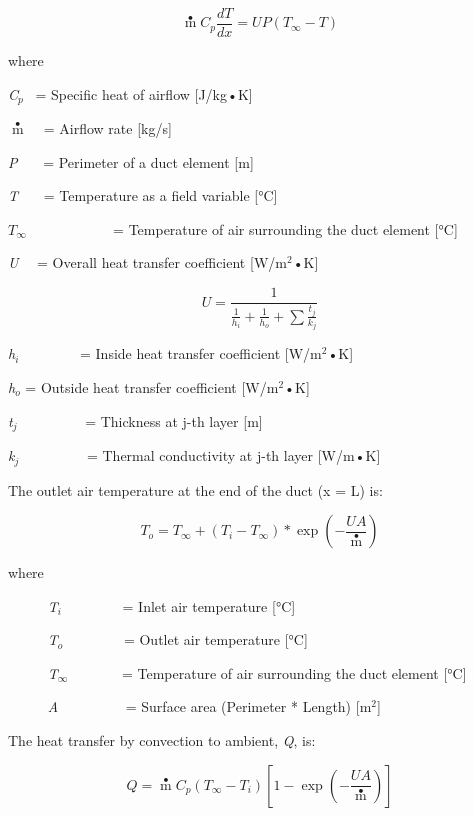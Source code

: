 \begin{equation}
\mathop m\limits^ \bullet  {C_p}\frac{{dT}}{{dx}} = UP(T{}_\infty  - T)
\end{equation}

where

\emph{C\(_{p}\)}~ = Specific heat of airflow {[}J/kg•K{]}

\(\mathop m\limits^ \bullet\) ~ = Airflow rate {[}kg/s{]}

\emph{P}~~~ = Perimeter of a duct element {[}m{]}

\emph{T}~~~ = Temperature as a field variable {[}°C{]}

\(T{}_\infty\) ~~~~~~~~~~~ = Temperature of air surrounding the duct element {[}°C{]}

\emph{U}~~ = Overall heat transfer coefficient {[}W/m\(^{2}\)•K{]}

\begin{equation}
U = \frac{1}{{\frac{1}{{{h_i}}} + \frac{1}{{{h_o}}} + \sum {\frac{{{t_j}}}{{{k_j}}}} }}
\end{equation}

\emph{h\(_{i}\)}~~~~~~~~ = Inside heat transfer coefficient {[}W/m\(^{2}\)•K{]}

\emph{h\(_{o}\)} = Outside heat transfer coefficient {[}W/m\(^{2}\)•K{]}

\emph{t\(_{j}\)}~~~~~~~~~ = Thickness at j-th layer {[}m{]}

\emph{k\(_{j}\)}~~~~~~~~~ = Thermal conductivity at j-th layer {[}W/m•K{]}

The outlet air temperature at the end of the duct (x = L) is:

\begin{equation}
{T_o} = {T_\infty } + ({T_i} - {T_\infty })*\exp \left( { - \frac{{UA}}{{\mathop {m{C_p}}\limits^ \bullet  }}} \right)
\end{equation}

where

~~~~~ \emph{T\(_{i}\)}~~~~~~~~ = Inlet air temperature {[}°C{]}

~~~~~ \emph{T\(_{o}\)}~~~~~~~~ = Outlet air temperature {[}°C{]}

~~~~~ \emph{T\(_{∞}\)}~~~~~~~ = Temperature of air surrounding the duct element {[}°C{]}

~~~~~ \emph{A}~~~~~~~~~ = Surface area (Perimeter * Length) {[}m\(^{2}\){]}

The heat transfer by convection to ambient, \emph{Q}, is:

\begin{equation}
Q = \mathop m\limits^ \bullet  {C_p}({T_\infty } - {T_i})\left[ {1 - \exp \left( { - \frac{{UA}}{{\mathop {m{C_p}}\limits^ \bullet  }}} \right)} \right]
\end{equation}

